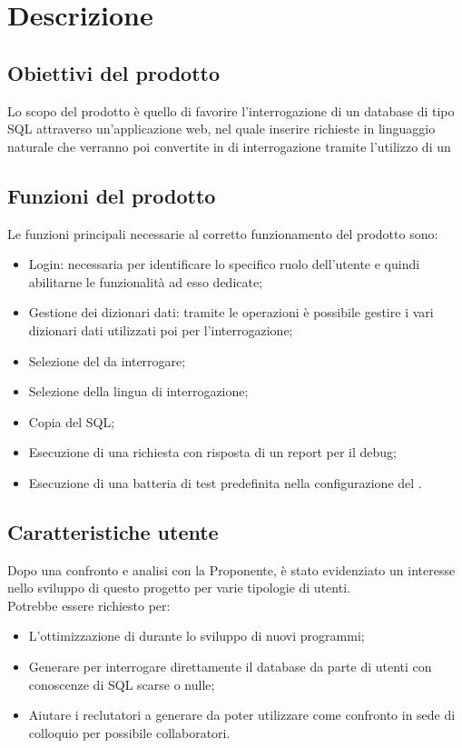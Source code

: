 \section{Descrizione}

\subsection{Obiettivi del prodotto}
Lo scopo del prodotto è quello di favorire l’interrogazione di un database di tipo SQL attraverso un’applicazione web, nel quale inserire richieste in linguaggio naturale che verranno poi convertite in  di interrogazione tramite l’utilizzo di un 

\subsection{Funzioni del prodotto}
Le funzioni principali necessarie al corretto funzionamento del prodotto sono:
\begin{itemize}
  \item Login: necessaria per identificare lo specifico ruolo dell’utente e quindi abilitarne le funzionalità ad esso dedicate;
  \item Gestione dei dizionari dati: tramite le operazioni  è possibile gestire i vari dizionari dati utilizzati poi per l’interrogazione;
  \item Selezione del  da interrogare;
  \item Selezione della lingua di interrogazione;
  \item Copia del  SQL;
  \item Esecuzione di una richiesta con risposta di un report per il debug;
  \item Esecuzione di una batteria di test predefinita nella configurazione del .
\end{itemize}

\subsection{Caratteristiche utente}
Dopo una confronto e analisi con la Proponente, è stato evidenziato un interesse nello sviluppo di questo progetto per varie tipologie di utenti.\\
Potrebbe essere richiesto per:
\begin{itemize}
  \item L'ottimizzazione di  durante lo sviluppo di nuovi programmi;
  \item Generare  per interrogare direttamente il database da parte di utenti con conoscenze di SQL scarse o nulle;
  \item Aiutare i reclutatori a generare  da poter utilizzare come confronto in sede di colloquio per possibile collaboratori.
\end{itemize}

